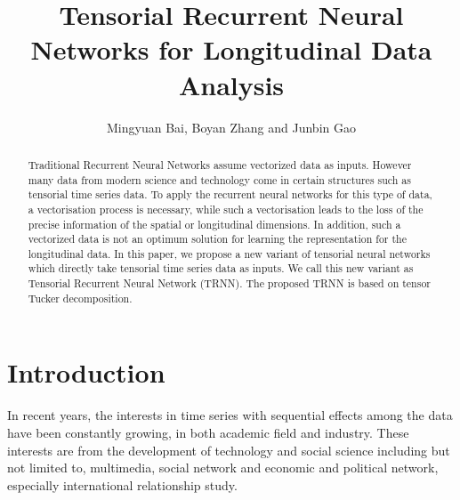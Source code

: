 \documentclass[journal]{IEEEtran}
\newcounter{gaocomm}
\newcommand{\GaoC}[1]{\textcolor{blue-violet}{\stepcounter{gaocomm}{\bf [Junbin's comment \arabic{gaocomm}: #1]}\;}}
\begin{document}
\title{\textbf{Tensorial Recurrent Neural Networks for Longitudinal Data Analysis}}
\author{Mingyuan Bai, 
        Boyan Zhang and Junbin Gao 
}
\maketitle
\begin{abstract}
Traditional Recurrent Neural Networks assume vectorized data as inputs. However many data from modern science and technology come in certain structures such as tensorial time series data.  To apply the recurrent neural networks for this type of data, a vectorisation process is necessary, while such a vectorisation leads to the loss of the precise information of the spatial or longitudinal dimensions. In addition, such a vectorized data is not an optimum solution for learning the representation for the longitudinal data. 
In this paper, we propose a new variant of tensorial neural networks which directly take tensorial time series data as inputs. 
We call this new variant as Tensorial Recurrent Neural Network (TRNN). The proposed TRNN is based on tensor Tucker decomposition.
\end{abstract}

\section{Introduction}\label{Sec:1}

In recent years, the interests in time series with sequential effects among the data have been constantly growing, in both academic field and industry.  These interests are from the development of technology and social science including but not limited to, multimedia, social network and economic and political network, especially international relationship study. 
\end{document}
